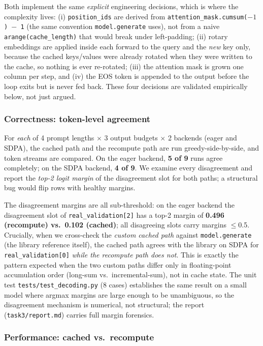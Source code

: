 \documentclass[conference]{IEEEtran}
\newcommand{\code}[1]{\texttt{\small #1}}
\begin{document}
Both implement the same \emph{explicit} engineering decisions,
which is where the complexity lives:
(i) \code{position\_ids} are derived from
\code{attention\_mask.cumsum($-1$) $-$ 1} (the same convention
\code{model.generate} uses), not from a naive
\code{arange(cache\_length)} that would break under left-padding;
(ii) rotary embeddings are applied inside each forward to the
query and the \emph{new} key only, because the cached
keys/values were already rotated when they were written to the
cache, so nothing is ever re-rotated;
(iii) the attention mask is grown one column per step, and
(iv) the EOS token is appended to the output before the loop
exits but is never fed back. These four decisions are validated
empirically below, not just argued.

\subsubsection{Correctness: token-level agreement}
\label{sec:correctness}

For \emph{each} of 4 prompt lengths $\times$ 3 output budgets
$\times$ 2 backends (eager and SDPA), the cached path and the
recompute path are run greedy-side-by-side, and token streams are
compared. On the eager backend, \textbf{5 of 9} runs agree
completely; on the SDPA backend, \textbf{4 of 9}. We examine
every disagreement and report the \emph{top-2 logit margin} of the
disagreement slot for both paths; a structural bug would flip
rows with healthy margins.

The disagreement margins are all sub-threshold: on the eager
backend the disagreement slot of \code{real\_validation[2]} has a
top-2 margin of \textbf{0.496 (recompute) vs.\ 0.102 (cached)};
all disagreeing slots carry margins $\leq$0.5. Crucially, when we
cross-check the \emph{custom cached path} against
\code{model.generate} (the library reference itself), the cached
path agrees with the library on SDPA for \code{real\_validation[0]}
\emph{while the recompute path does not}. This is exactly the
pattern expected when the two custom paths differ only in
floating-point accumulation order (long-sum vs.\
incremental-sum), not in cache state. The unit test
\code{tests/test\_decoding.py} (8 cases) establishes the same
result on a small model where argmax margins are large enough to
be unambiguous, so the disagreement mechanism is numerical, not
structural; the report
(\code{task3/report.md}) carries full margin forensics.

\subsubsection{Performance: cached vs.\ recompute}
\label{sec:kvperf}
\end{document}
